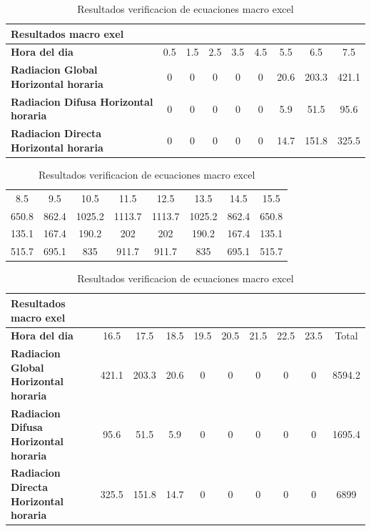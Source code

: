 \begin{table}[h!]
\caption{Resultados verificacion de ecuaciones macro excel}
\begin{tabular}{|l|c|c|c|c|c|c|c|c|}
        \hline
        \textbf{Resultados macro exel}&&&&&&&&\\
        \hline
        \textbf{Hora del dia}&0.5&1.5&2.5&3.5&4.5&5.5&6.5&7.5\\
        \hline
        \textbf{Radiacion Global Horizontal horaria}&0&0&0&0&0&20.6&203.3&421.1\\
        \hline
        \textbf{Radiacion Difusa Horizontal horaria}&0&0&0&0&0&5.9&51.5&95.6\\
        \hline
        \textbf{Radiacion Directa Horizontal horaria}&0&0&0&0&0&14.7&151.8&325.5\\
        \hline
\end{tabular}
\begin{tabular}{|c|c|c|c|c|c|c|c|}
        \hline
        &&&&&&&\\
        \hline
        8.5&9.5&10.5&11.5&12.5&13.5&14.5&15.5\\
        \hline
        650.8&862.4&1025.2&1113.7&1113.7&1025.2&862.4&650.8\\
        \hline
        135.1&167.4&190.2&202&202&190.2&167.4&135.1\\
        \hline
        515.7&695.1&835&911.7&911.7&835&695.1&515.7\\
        \hline
\end{tabular}
\begin{tabular}{|l|c|c|c|c|c|c|c|c|c|}
        \hline
        \textbf{Resultados macro exel}&&&&&&&&&\\
        \hline
        \textbf{Hora del dia}&16.5&17.5&18.5&19.5&20.5&21.5&22.5&23.5&Total\\
        \hline
        \textbf{Radiacion Global Horizontal horaria}&421.1&203.3&20.6&0&0&0&0&0&8594.2\\
        \hline
        \textbf{Radiacion Difusa Horizontal horaria}&95.6&51.5&5.9&0&0&0&0&0&1695.4\\
        \hline
        \textbf{Radiacion Directa Horizontal horaria}&325.5&151.8&14.7&0&0&0&0&0&6899\\
        \hline
\end{tabular}
\end{table}

